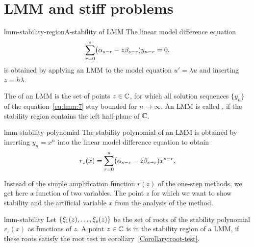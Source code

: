 \section{LMM and stiff problems}

\begin{Definition*}{lmm-stability-region}{A-stability of LMM}
  The linear model difference equation
  \begin{gather}
    \label{eq:lmm:7}
    \sum_{r=0}^{s} \bigl(\alpha_{s-r} - z \beta_{s-r}) y_{n-r} = 0.
  \end{gather}
  is obtained by applying an LMM to the model equation
  $u' = \lambda u$ and inserting $z=h\lambda$.

  The  of an LMM is the set of points $z\in \mathbb C$,
  for which all solution sequences $\{y_n\}$ of the equation~\eqref{eq:lmm:7}
  stay bounded for $n\to\infty$. An LMM is called , if the 
  stability region contains the left half-plane of $\mathbb C$.
\end{Definition*}


\begin{Definition}{lmm-stability-polynomial}
  The stability polynomial of an LMM is obtained by inserting
  $y_n = x^n$ into the linear model difference equation to obtain
  \begin{gather}
    \label{eq:lmm:8}
    r_z(x) = \sum_{r=0}^{s} \bigl(\alpha_{s-r} - z \beta_{s-r})
    x^{s-r}.
  \end{gather}
\end{Definition}

\begin{remark}
  Instead of the simple amplification function $r(z)$ of the one-step
  methods, we get here a function of two variables.  The point $z$ for
  which we want to show stability and the artificial variable $x$ from
  the analysis of the method.
\end{remark}

\begin{Lemma}{lmm-stability}
  Let $\{\xi_1(z),\dots,\xi_s(z)\}$ be the set of roots of the
  stability polynomial $r_z(x)$ as functions of $z$.
  A point $z\in \mathbb C$ is in the stability region of a LMM, if these
  roots satisfy the root test in corollary~\ref{Corollary:root-test}.
\end{Lemma}

